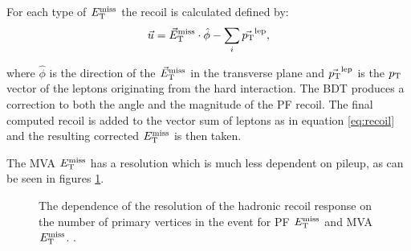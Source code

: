 For each type of $\MET$ the recoil is calculated defined by:
\begin{equation}
\vec{u} = \vec E_\mathrm{T}^\mathrm{miss} \cdot \hat{\phi} - \sum_{i}{ \vec{p_{\mathrm{T}}}^{\text{lep}}} ,
\label{eq:recoil}
\end{equation}

where $\hat{\phi}$ is the direction of the $\vec E_\mathrm{T}^\mathrm{miss}$ in the transverse plane and
$\vec{p_{\mathrm{T}}}^{\text{lep}}$ is the $p_{\mathrm{T}}$ vector of the leptons originating from the
hard interaction. The \ac{BDT} produces a correction to both the angle and the
magnitude of the \ac{PF} recoil. The final computed recoil is added to the
vector sum of leptons as in equation \ref{eq:recoil} and the resulting corrected
$\MET$ is then taken. 

The MVA $\MET$ has a resolution which is much less
dependent on pileup, as can be seen in figures \ref{fig:mvamet}.

\begin{figure}
\begin{center}
\end{center}
\caption[The dependence of the resolution of the hadronic
recoil response on the number of primary vertices in the event for PF
$\MET$ and MVA $\MET$.]
{The dependence of the resolution of the hadronic
recoil response on the number of primary vertices in the event for \ac{PF}
$\MET$ and MVA $\MET$.
\cite{CMS-PAS-JME-12-002}.
}
\label{fig:mvamet}
\end{figure}

